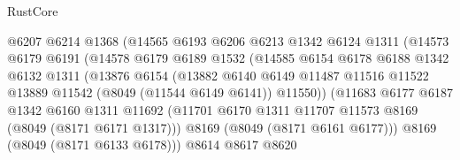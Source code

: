 \begin{lexlean}{RustCore}
\begin{coremodule}
                              @6207
                              @6214
                              @1368
                              (@14565
                                @6193
                                @6206
                                @6213
                                @1342
                                @6124
                                @1311
                                (@14573
                                  @6179
                                  @6191
                                  (@14578
                                    @6179
                                    @6189
                                    @1532
                                    (@14585
                                      @6154
                                      @6178
                                      @6188
                                      @1342
                                      @6132
                                      @1311
                                      (@13876
                                        @6154
                                        (@13882
                                          @6140
                                          @6149
                                          @11487
                                          @11516
                                          @11522
                                          @13889
                                          @11542
                                          (@8049 (@11544 @6149 @6141))
                                          @11550))
                                      (@11683
                                        @6177
                                        @6187
                                        @1342
                                        @6160
                                        @1311
                                        @11692
                                        (@11701
                                          @6170
                                          @1311
                                          @11707
                                          @11573
                                          @8169
                                          (@8049 (@8171 @6171 @1317)))
                                        @8169
                                        (@8049 (@8171 @6161 @6177)))
                                      @8169
                                      (@8049 (@8171 @6133 @6178)))
                                    @8614
                                    @8617
                                    @8620

\end{coremodule}
\end{lexlean}
